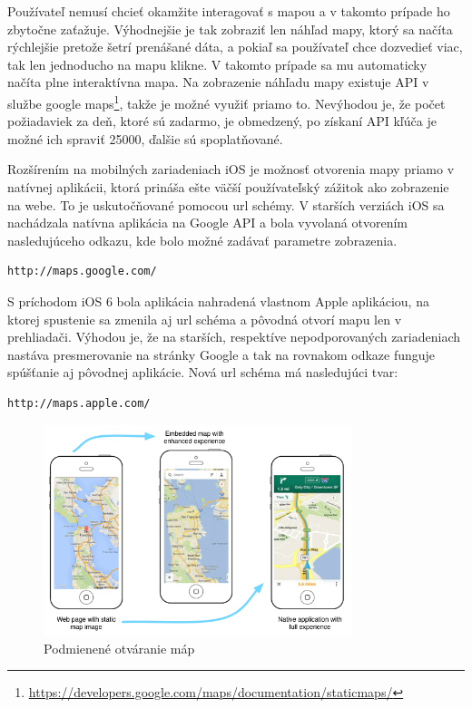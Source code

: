 Používateľ nemusí chcieť okamžite interagovať s mapou a v takomto prípade ho zbytočne zaťažuje. Výhodnejšie je tak zobraziť len náhľad mapy, ktorý sa načíta rýchlejšie pretože šetrí prenášané dáta, a pokiaľ sa používateľ chce dozvedieť viac, tak len jednoducho na mapu klikne. V takomto prípade sa mu automaticky načíta plne interaktívna mapa. Na zobrazenie náhľadu mapy existuje API v službe google maps\footnote{\url{https://developers.google.com/maps/documentation/staticmaps/}}, takže je možné využiť priamo to. Nevýhodou je, že počet požiadaviek za deň, ktoré sú zadarmo, je obmedzený, po získaní API kľúča je možné ich spraviť 25000, ďalšie sú spoplatňované.

Rozšírením na mobilných zariadeniach iOS je možnosť otvorenia mapy priamo v natívnej aplikácii, ktorá prináša ešte väčší používateľský zážitok ako zobrazenie na webe. To je uskutočňované pomocou url schémy. V starších verziách iOS sa nachádzala natívna aplikácia na Google API a bola vyvolaná otvorením nasledujúceho odkazu, kde bolo možné zadávať parametre zobrazenia.

\begin{verbatim}
http://maps.google.com/
\end{verbatim}

S príchodom iOS 6 bola aplikácia nahradená vlastnom Apple aplikáciou, na ktorej spustenie sa zmenila aj url schéma a pôvodná otvorí mapu len v prehliadači. Výhodou je, že na starších, respektíve nepodporovaných zariadeniach nastáva presmerovanie na stránky Google a tak na rovnakom odkaze funguje spúšťanie aj pôvodnej aplikácie. Nová url schéma má nasledujúci tvar:

\begin{verbatim}
http://maps.apple.com/
\end{verbatim}

\begin{figure}[H]
  \centering
  \includegraphics[width=0.8\textwidth]{img/maps.png}
  \caption[Podmienené otváranie máp]{
    Podmienené otváranie máp}
\end{figure}

